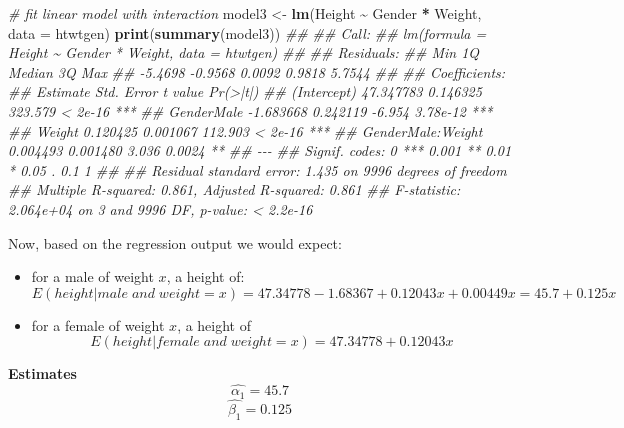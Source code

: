 \documentclass[
]{book}
\newenvironment{Shaded}{\begin{snugshade}}{\end{snugshade}}
\newcommand{\CommentTok}[1]{\textcolor[rgb]{0.56,0.35,0.01}{\textit{#1}}}
\newcommand{\DataTypeTok}[1]{\textcolor[rgb]{0.13,0.29,0.53}{#1}}
\newcommand{\KeywordTok}[1]{\textcolor[rgb]{0.13,0.29,0.53}{\textbf{#1}}}
\newcommand{\NormalTok}[1]{#1}
\newcommand{\OperatorTok}[1]{\textcolor[rgb]{0.81,0.36,0.00}{\textbf{#1}}}
\newcommand{\StringTok}[1]{\textcolor[rgb]{0.31,0.60,0.02}{#1}}
\providecommand{\tightlist}{%
  \setlength{\itemsep}{0pt}\setlength{\parskip}{0pt}}
\theoremstyle{definition}
\theoremstyle{definition}
\theoremstyle{definition}
\theoremstyle{remark}
\begin{document}
\begin{Shaded}
\begin{Highlighting}[]
\CommentTok{\# fit linear model with interaction }
\NormalTok{model3 \textless{}{-}}\StringTok{ }\KeywordTok{lm}\NormalTok{(Height }\OperatorTok{\textasciitilde{}}\StringTok{ }\NormalTok{Gender }\OperatorTok{*}\StringTok{ }\NormalTok{Weight, }\DataTypeTok{data =}\NormalTok{ htwtgen)}
\KeywordTok{print}\NormalTok{(}\KeywordTok{summary}\NormalTok{(model3))}
\CommentTok{\#\# }
\CommentTok{\#\# Call:}
\CommentTok{\#\# lm(formula = Height \textasciitilde{} Gender * Weight, data = htwtgen)}
\CommentTok{\#\# }
\CommentTok{\#\# Residuals:}
\CommentTok{\#\#     Min      1Q  Median      3Q     Max }
\CommentTok{\#\# {-}5.4698 {-}0.9568  0.0092  0.9818  5.7544 }
\CommentTok{\#\# }
\CommentTok{\#\# Coefficients:}
\CommentTok{\#\#                    Estimate Std. Error t value Pr(\textgreater{}|t|)    }
\CommentTok{\#\# (Intercept)       47.347783   0.146325 323.579  \textless{} 2e{-}16 ***}
\CommentTok{\#\# GenderMale        {-}1.683668   0.242119  {-}6.954 3.78e{-}12 ***}
\CommentTok{\#\# Weight             0.120425   0.001067 112.903  \textless{} 2e{-}16 ***}
\CommentTok{\#\# GenderMale:Weight  0.004493   0.001480   3.036   0.0024 ** }
\CommentTok{\#\# {-}{-}{-}}
\CommentTok{\#\# Signif. codes:  0 \textquotesingle{}***\textquotesingle{} 0.001 \textquotesingle{}**\textquotesingle{} 0.01 \textquotesingle{}*\textquotesingle{} 0.05 \textquotesingle{}.\textquotesingle{} 0.1 \textquotesingle{} \textquotesingle{} 1}
\CommentTok{\#\# }
\CommentTok{\#\# Residual standard error: 1.435 on 9996 degrees of freedom}
\CommentTok{\#\# Multiple R{-}squared:  0.861,	Adjusted R{-}squared:  0.861 }
\CommentTok{\#\# F{-}statistic: 2.064e+04 on 3 and 9996 DF,  p{-}value: \textless{} 2.2e{-}16}
\end{Highlighting}
\end{Shaded}

Now, based on the regression output we would expect:

\begin{itemize}
\tightlist
\item
  for a male of weight \(x\), a height of:
  \[E(height|male\; and \; weight=x)=47.34778 - 1.68367 + 0.12043x + 0.00449x = 45.7 + 0.125x\]
\item
  for a female of weight \(x\), a height of \[E(height|female\; and \; weight=x)=47.34778 + 0.12043x\]
\end{itemize}

\textbf{Estimates}
\[\hat{\alpha_1} = 45.7\]
\[\hat{\beta_1} = 0.125\]
\end{document}
